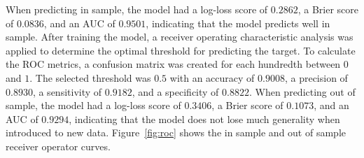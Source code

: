 When predicting in sample, the model had a log-loss score of $0.2862$, a Brier score of $0.0836$, and an AUC of $0.9501$, indicating that the model predicts well in sample. 
After training the model, a receiver operating characteristic analysis was applied to determine the optimal threshold for predicting the target. 
To calculate the ROC metrics, a confusion matrix was created for each hundredth between $0$ and $1$. 
The selected threshold was $0.5$ with an accuracy of $0.9008$, a precision of $0.8930$, a sensitivity of $0.9182$, and a specificity of $0.8822$.
When predicting out of sample, the model had a log-loss score of $0.3406$, a Brier score of $0.1073$, and an AUC of $0.9294$, indicating that the model does not lose much generality when introduced to new data. 
Figure~\ref{fig:roc} shows the in sample and out of sample receiver operator curves.